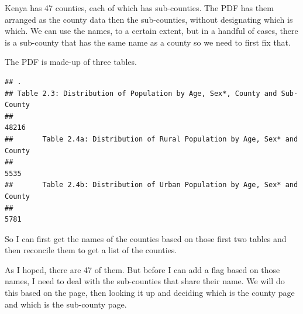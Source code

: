 \documentclass[
]{book}
\newenvironment{Shaded}{\begin{snugshade}}{\end{snugshade}}
\newcommand{\CommentTok}[1]{\textcolor[rgb]{0.56,0.35,0.01}{\textit{#1}}}
\newcommand{\KeywordTok}[1]{\textcolor[rgb]{0.13,0.29,0.53}{\textbf{#1}}}
\newcommand{\NormalTok}[1]{#1}
\newcommand{\OperatorTok}[1]{\textcolor[rgb]{0.81,0.36,0.00}{\textbf{#1}}}
\newcommand{\StringTok}[1]{\textcolor[rgb]{0.31,0.60,0.02}{#1}}
\begin{document}
Kenya has 47 counties, each of which has sub-counties. The PDF has them arranged as the county data then the sub-counties, without designating which is which. We can use the names, to a certain extent, but in a handful of cases, there is a sub-county that has the same name as a county so we need to first fix that.

The PDF is made-up of three tables.

\begin{Shaded}
\end{Shaded}

\begin{verbatim}
## .
## Table 2.3: Distribution of Population by Age, Sex*, County and Sub- County 
##                                                                      48216 
##       Table 2.4a: Distribution of Rural Population by Age, Sex* and County 
##                                                                       5535 
##       Table 2.4b: Distribution of Urban Population by Age, Sex* and County 
##                                                                       5781
\end{verbatim}

So I can first get the names of the counties based on those first two tables and then reconcile them to get a list of the counties.

\begin{Shaded}
\end{Shaded}

As I hoped, there are 47 of them. But before I can add a flag based on those names, I need to deal with the sub-counties that share their name. We will do this based on the page, then looking it up and deciding which is the county page and which is the sub-county page.
\end{document}
